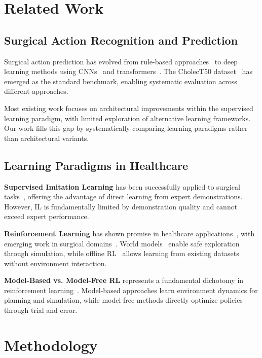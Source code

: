 \documentclass[conference]{IEEEtran}
\begin{document}
\section{Related Work}

\subsection{Surgical Action Recognition and Prediction}

Surgical action prediction has evolved from rule-based approaches~\cite{padoy2012statistical} to deep learning methods using CNNs~\cite{twinanda2016endonet} and transformers~\cite{gao2022trans}. The CholecT50 dataset~\cite{nwoye2022cholect50} has emerged as the standard benchmark, enabling systematic evaluation across different approaches.

Most existing work focuses on architectural improvements within the supervised learning paradigm, with limited exploration of alternative learning frameworks. Our work fills this gap by systematically comparing learning paradigms rather than architectural variants.

\subsection{Learning Paradigms in Healthcare}

\textbf{Supervised Imitation Learning} has been successfully applied to surgical tasks~\cite{murali2015learning, thananjeyan2017multilateral}, offering the advantage of direct learning from expert demonstrations. However, IL is fundamentally limited by demonstration quality and cannot exceed expert performance.

\textbf{Reinforcement Learning} has shown promise in healthcare applications~\cite{gottesman2019guidelines, popova2018deep}, with emerging work in surgical domains~\cite{richter2019open}. World models~\cite{ha2018world} enable safe exploration through simulation, while offline RL~\cite{levine2020offline} allows learning from existing datasets without environment interaction.

\textbf{Model-Based vs. Model-Free RL} represents a fundamental dichotomy in reinforcement learning~\cite{moerland2023model}. Model-based approaches learn environment dynamics for planning and simulation, while model-free methods directly optimize policies through trial and error.

\section{Methodology}
\end{document}
